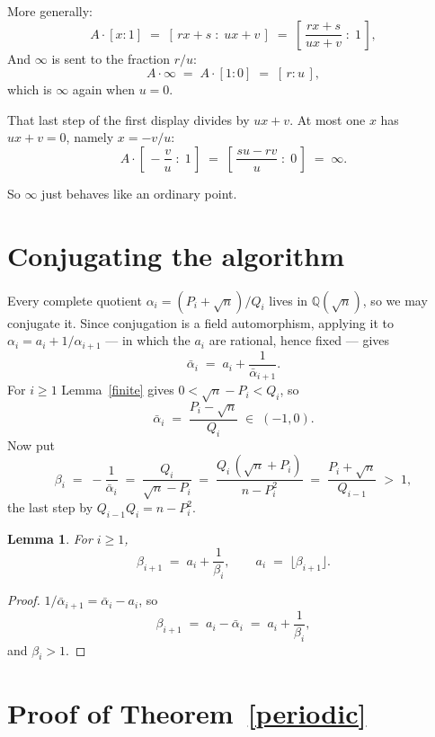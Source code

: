 \documentclass[12pt,a4paper]{article}
\theoremstyle{plain}
\newtheorem{lemma}[theorem]{Lemma}
\theoremstyle{definition}
\begin{document}
More generally:
\[
  A \cdot [x : 1] \;=\; [\,rx+s \;:\; ux+v\,]
    \;=\; \left[\,\frac{rx+s}{ux+v} \;:\; 1\,\right] ,
\]
And $\infty$ is sent to the fraction $r/u$:
\[
  A\cdot\infty \;=\; A\cdot[1:0] \;=\; [\,r:u\,] ,
\]
which is $\infty$ again when $u = 0$.

That last step of the first display divides by $ux+v$. At most one $x$ has
$ux+v = 0$, namely $x = -v/u$:
\[
  A \cdot \left[\,-\frac{v}{u} \;:\; 1\,\right]
    \;=\; \left[\,\frac{su-rv}{u} \;:\; 0\,\right]
    \;=\; \infty .
\]

So $\infty$ just behaves like an ordinary point.



\section{Conjugating the algorithm}

Every complete quotient $\alpha_i = (P_i + \sqrt n)/Q_i$ lives in
$\mathbb{Q}(\sqrt n)$, so we may conjugate it. Since conjugation is a field
automorphism, applying it to $\alpha_i = a_i + 1/\alpha_{i+1}$ --- in which the
$a_i$ are rational, hence fixed --- gives
\[
  \bar\alpha_i \;=\; a_i + \frac{1}{\bar\alpha_{i+1}} .
\]
For $i \geq 1$ Lemma~\ref{finite} gives $0 < \sqrt n - P_i < Q_i$, so
\[
  \bar\alpha_i \;=\; \frac{P_i - \sqrt n}{Q_i} \;\in\; (-1,0) .
\]
Now put
\[
  \beta_i \;=\; -\frac{1}{\bar\alpha_i}
    \;=\; \frac{Q_i}{\sqrt n - P_i}
    \;=\; \frac{Q_i\,(\sqrt n + P_i)}{n - P_i^2}
    \;=\; \frac{P_i + \sqrt n}{Q_{i-1}} \;>\; 1 ,
\]
the last step by $Q_{i-1}Q_i = n - P_i^2$.

\begin{center}
\colorbox{black!8}{%
\begin{minipage}{0.93\textwidth}
\begin{lemma}\label{back}
For $i \geq 1$,
\[
  \beta_{i+1} \;=\; a_i + \frac{1}{\beta_i} ,
  \qquad
  a_i \;=\; \lfloor \beta_{i+1} \rfloor .
\]
\end{lemma}
\end{minipage}}
\end{center}

\begin{proof}
$1/\bar\alpha_{i+1} = \bar\alpha_i - a_i$, so
\[
  \beta_{i+1} \;=\; a_i - \bar\alpha_i \;=\; a_i + \frac{1}{\beta_i} ,
\]
and $\beta_i > 1$.
\end{proof}

\section{Proof of Theorem~\ref{periodic}}
\end{document}
